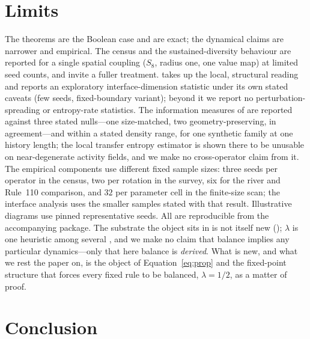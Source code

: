 \documentclass[man,12pt,floatsintext,donotrepeattitle]{apa7}
\newcommand{\secref}[1]{\emph{\nameref{#1}}}
\begin{document}
\section{Limits}
\label{sec:limits}

The theorems are the Boolean case and are exact; the dynamical claims are
narrower and empirical. The census and the sustained-diversity behaviour are
reported for a single spatial coupling ($S_8$, radius one, one value map) at
limited seed counts, and invite a fuller treatment. \secref{sec:discussion}
takes up the local, structural reading and reports an exploratory
interface-dimension statistic under its own stated caveats (few seeds,
fixed-boundary variant); beyond it we report no perturbation-spreading or
entropy-rate statistics. The information measures of
\secref{sec:eoc-compute} are reported against three stated nulls---one
size-matched, two geometry-preserving, in agreement---and within a stated
density range, for one synthetic family at one history length; the local
transfer entropy estimator is shown there to be unusable on near-degenerate
activity fields,
and we make no cross-operator claim from it.
The empirical components use different fixed sample sizes: three seeds per
operator in the census, two per rotation in the survey, six for the river and
Rule~110 comparison, and $32$ per parameter cell in the finite-size scan; the
interface analysis uses the smaller samples stated with that result.
Illustrative diagrams use pinned representative seeds. All are reproducible
from the accompanying package. The
substrate the object sits in is not itself new (\secref{sec:object}); $\lambda$
is one heuristic among several \parencite{wuensche1999classifying}, and we
make no claim that balance implies any particular dynamics---only that here
balance is \emph{derived}. What is new, and what we rest the paper on, is the
object of Equation~\eqref{eq:prop} and the fixed-point structure that forces
every fixed rule to be balanced, $\lambda = 1/2$, as a matter of proof.

\section{Conclusion}
\label{sec:conclusion}
\end{document}
